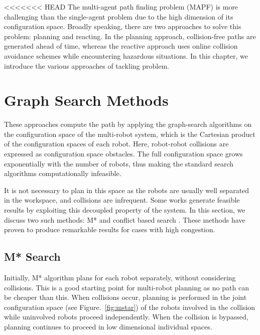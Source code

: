 <<<<<<< HEAD
The multi-agent path finding problem (MAPF) is more challenging than the single-agent problem due to the high dimension of its configuration space. Broadly speaking, there are two approaches to solve this problem: planning and reacting. In the planning approach, collision-free paths are generated ahead of time, whereas the reactive approach uses online collision avoidance schemes while encountering hazardous situations. In this chapter, we introduce the various approaches of tackling problem. 

\section{Graph Search Methods}
These approaches compute the path by applying the graph-search algorithms on the configuration space of the multi-robot system, which is the Cartesian product of the configuration spaces of each robot. Here, robot-robot collisions are expressed as configuration space obstacles. The full configuration space grows exponentially with the number of robots, thus making the standard search algorithms computationally infeasible. 

It is not necessary to plan in this space as the robots are usually well separated in the workspace, and collisions are infrequent. Some works generate feasible results by exploiting this decoupled property of the system. In this section, we discuss two such methods: M* \cite{wagner2011m} and conflict based search \cite{sharon2015conflict}. These methods have proven to produce remarkable results for cases with high congestion. 
\subsection{M* Search}
Initially, M* algorithm plans for each robot separately, without considering collisions. This is a good starting point for multi-robot planning as no path can be cheaper than this. When collisions occur, planning is performed in the joint configuration space (see Figure.~\ref{fig:mstar}) of the robots involved in the collision while uninvolved robots proceed independently. When the collision is bypassed, planning continues to proceed in low dimensional individual spaces. 

